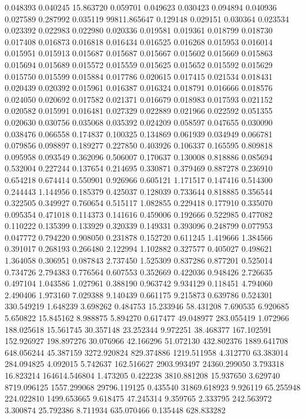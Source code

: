 0.048393
0.040245
15.863720
0.059701
0.049623
0.030423
0.094894
0.040936
0.027589
0.287992
0.035119
99811.865647
0.129148
0.029151
0.030364
0.023534
0.023392
0.022983
0.022980
0.020336
0.019581
0.019361
0.018799
0.018730
0.017408
0.016873
0.016818
0.016434
0.016525
0.016268
0.015953
0.016014
0.015951
0.015913
0.015687
0.015687
0.015667
0.015602
0.015669
0.015863
0.015694
0.015689
0.015572
0.015559
0.015625
0.015652
0.015592
0.015629
0.015750
0.015599
0.015884
0.017786
0.020615
0.017415
0.021534
0.018431
0.020439
0.020392
0.015961
0.016387
0.016324
0.018791
0.016666
0.018576
0.024050
0.020692
0.017582
0.021371
0.016679
0.018983
0.017593
0.021152
0.020582
0.015991
0.016481
0.027329
0.022889
0.021966
0.022592
0.051355
0.020630
0.030756
0.035068
0.035392
0.024209
0.058597
0.047655
0.030090
0.038476
0.066558
0.174837
0.100325
0.134869
0.061939
0.034949
0.066781
0.079856
0.098897
0.189277
0.227850
0.403926
0.106337
0.165595
0.809818
0.095958
0.093549
0.362096
0.506007
0.170637
0.130008
0.818886
0.085694
0.532004
0.227244
0.137654
0.214695
0.330871
0.379469
0.887278
0.236910
0.654218
0.674414
0.550901
0.926966
0.605121
1.171517
0.147416
0.514300
0.244443
1.144956
0.185379
0.425037
0.128039
0.733644
0.818885
0.356544
0.322505
0.349927
0.760654
0.515117
1.082855
0.229418
0.177910
0.335070
0.095354
0.471018
0.114373
0.141616
0.459006
0.192666
0.522985
0.477082
0.110222
0.135399
0.133929
0.320339
0.149331
0.393096
0.248799
0.077953
0.047772
0.794220
0.908050
0.231878
0.152720
0.611245
1.419666
1.384566
0.391017
0.268193
0.266480
2.122994
1.102882
0.327577
0.405027
0.498621
1.364058
0.306951
0.087843
2.737450
1.525309
0.837286
0.877201
0.525014
0.734726
2.794383
0.776564
0.607553
0.352669
0.422036
0.948426
2.726635
0.497104
1.043586
1.027961
0.388190
0.963742
9.934129
0.118451
4.794060
2.490406
1.973160
7.029388
9.140439
0.661175
9.215873
0.639786
0.524301
330.549219
1.648239
3.698262
0.484753
15.233946
58.431208
7.690535
6.920685
5.650822
15.845162
8.988875
5.894270
0.617477
49.048977
283.055419
1.072966
188.025618
15.561745
30.357148
23.252344
9.972251
38.468377
167.102591
152.926927
198.897276
30.076966
42.166296
51.072130
432.802376
1889.641708
648.056244
45.387159
3272.920824
829.374886
1219.511958
4.312770
63.383014
284.094825
4.092015
5.742637
162.516627
2903.993497
24360.299050
3.793318
16.823214
164614.546804
1.473205
0.422238
3810.881208
15.937650
3.629740
8719.096125
1557.299068
29796.119125
0.435540
31869.618923
9.926119
65.255948
224.022810
1499.653665
9.618475
47.245314
9.359765
2.333795
242.563972
3.300874
25.792386
8.711934
635.070466
0.135448
628.833282
